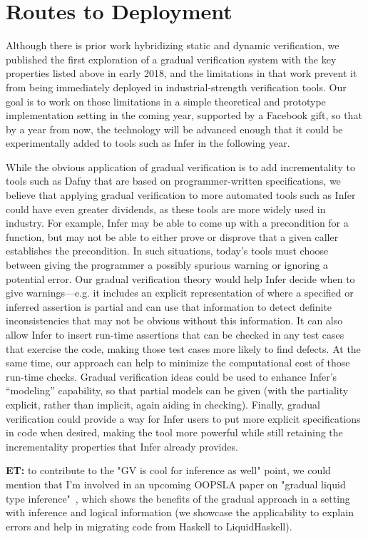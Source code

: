\documentclass[10pt,twocolumn]{article}
\newcommand{\et}[1]{{\color{blue} {\bf ET:} #1}}
\begin{document}
\begin{sloppypar}
\section{Routes to Deployment}

Although there is prior work hybridizing static and dynamic verification, we published the first exploration of a gradual verification system with the key properties listed above in early 2018, and the limitations in that work prevent it from being immediately deployed in industrial-strength verification tools.  Our goal is to work on those limitations in a simple theoretical and prototype implementation setting in the coming year, supported by a Facebook gift, so that by a year from now, the technology will be advanced enough that it could be experimentally added to tools such as Infer in the following year.

While the obvious application of gradual verification is to add incrementality to tools such as Dafny that are based on programmer-written specifications, we believe that applying gradual verification to more automated tools such as Infer could have even greater dividends, as these tools are more widely used in industry. For example, Infer may be able to come up with a precondition for a function, but may not be able to either prove or disprove that a given caller establishes the precondition.  In such situations, today's tools must choose between giving the programmer a possibly spurious warning or ignoring a potential error. Our gradual verification theory would help Infer decide when to give warnings---e.g. it includes an explicit representation of where a specified or inferred assertion is partial and can use that information to detect definite inconsistencies that may not be obvious without this information.  It can also allow Infer to insert run-time assertions that can be checked in any test cases that exercise the code, making those test cases more likely to find defects.  At the same time, our approach can help to minimize the computational cost of those run-time checks.  Gradual verification ideas could be used to enhance Infer's ``modeling'' capability, so that partial models can be given (with the partiality explicit, rather than implicit, again aiding in checking). Finally, gradual verification could provide a way for Infer users to put more explicit specifications in code when desired, making the tool more powerful while still retaining the incrementality properties that Infer already provides.

\et{to contribute to the "GV is cool for inference as well" point, we could mention that I'm involved in an upcoming OOPSLA paper on "gradual liquid type inference"~\cite{vazouAl:oopsla2018}, which shows the benefits of the gradual approach in a setting with inference and logical information (we showcase the applicability to explain errors and help in migrating code from Haskell to LiquidHaskell).}


\end{sloppypar}
\end{document}
